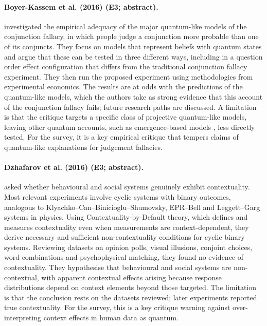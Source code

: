 \documentclass[10pt,a4paper]{article}
\begin{document}
\paragraph{Boyer-Kassem et al. (2016) (E3; abstract).} \citet{BoyerKassem2016} investigated the empirical adequacy of the major quantum-like models of the conjunction fallacy, in which people judge a conjunction more probable than one of its conjuncts. They focus on models that represent beliefs with quantum states and argue that these can be tested in three different ways, including in a question order effect configuration that differs from the traditional conjunction fallacy experiment. They then run the proposed experiment using methodologies from experimental economics. The results are at odds with the predictions of the quantum-like models, which the authors take as strong evidence that this account of the conjunction fallacy fails; future research paths are discussed. A limitation is that the critique targets a specific class of projective quantum-like models, leaving other quantum accounts, such as emergence-based models \citep{Aerts2017}, less directly tested. For the survey, it is a key empirical critique that tempers claims of quantum-like explanations for judgement fallacies.

\paragraph{Dzhafarov et al. (2016) (E3; abstract).} \citet{Dzhafarov2016b} asked whether behavioural and social systems genuinely exhibit contextuality. Most relevant experiments involve cyclic systems with binary outcomes, analogous to Klyachko--Can--Binicioglu--Shumovsky, EPR--Bell and Leggett--Garg systems in physics. Using Contextuality-by-Default theory, which defines and measures contextuality even when measurements are context-dependent, they derive necessary and sufficient non-contextuality conditions for cyclic binary systems. Reviewing datasets on opinion polls, visual illusions, conjoint choices, word combinations and psychophysical matching, they found no evidence of contextuality. They hypothesise that behavioural and social systems are non-contextual, with apparent contextual effects arising because response distributions depend on context elements beyond those targeted. The limitation is that the conclusion rests on the datasets reviewed; later experiments \citep{Cervantes2018} reported true contextuality. For the survey, this is a key critique warning against over-interpreting context effects in human data as quantum.
\end{document}
